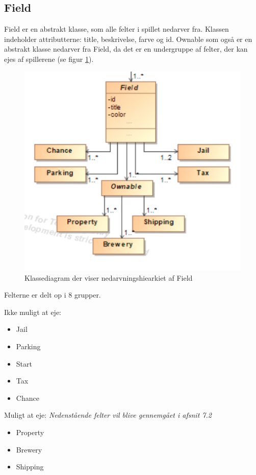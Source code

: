 \subsection{Field}
Field er en abstrakt klasse, som alle felter i spillet nedarver fra. Klassen indeholder attributterne: title, beskrivelse, farve og id. Ownable som også er en abstrakt klasse nedarver fra Field, da det er en undergruppe af felter, der kan ejes af spillerene (se figur \ref{fig:fieldArv}).

\begin{figure}[!h]
    \centering
    \includegraphics{sources/7_implementering/field-nedarvning.PNG}
    \caption{Klassediagram der viser nedarvningshiearkiet af Field}
    \label{fig:fieldArv}
\end{figure}

Felterne er delt op i 8 grupper.

Ikke muligt at eje:

\begin{itemize}
    \item Jail
    \item Parking
    \item Start
    \item Tax
    \item Chance
\end{itemize}

Muligt at eje:
\emph{Nedenstående felter vil blive gennemgået i afsnit 7.2}

\begin{itemize}
    \item Property
    \item Brewery
    \item Shipping
\end{itemize}



